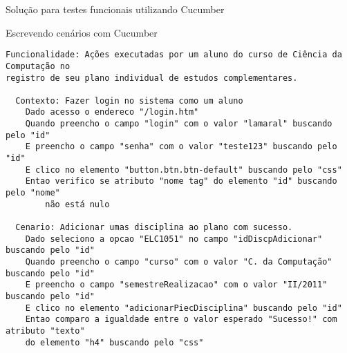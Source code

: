 \documentclass{beamer}
\begin{document}
\begin{frame}[fragile]{Solução para testes funcionais utilizando Cucumber}
    \item Escrevendo cenários com Cucumber
    \begin{lstlisting}
Funcionalidade: Ações executadas por um aluno do curso de Ciência da Computação no
registro de seu plano individual de estudos complementares.

  Contexto: Fazer login no sistema como um aluno
    Dado acesso o endereco "/login.htm"
    Quando preencho o campo "login" com o valor "lamaral" buscando pelo "id"
    E preencho o campo "senha" com o valor "teste123" buscando pelo "id"
    E clico no elemento "button.btn.btn-default" buscando pelo "css"
    Entao verifico se atributo "nome tag" do elemento "id" buscando pelo "nome"
        não está nulo

  Cenario: Adicionar umas disciplina ao plano com sucesso.
    Dado seleciono a opcao "ELC1051" no campo "idDiscpAdicionar" buscando pelo "id"
    Quando preencho o campo "curso" com o valor "C. da Computação" buscando pelo "id"
    E preencho o campo "semestreRealizacao" com o valor "II/2011" buscando pelo "id"
    E clico no elemento "adicionarPiecDisciplina" buscando pelo "id"
    Entao comparo a igualdade entre o valor esperado "Sucesso!" com atributo "texto"
    do elemento "h4" buscando pelo "css"
    \end{lstlisting}
\end{frame}
\end{document}
